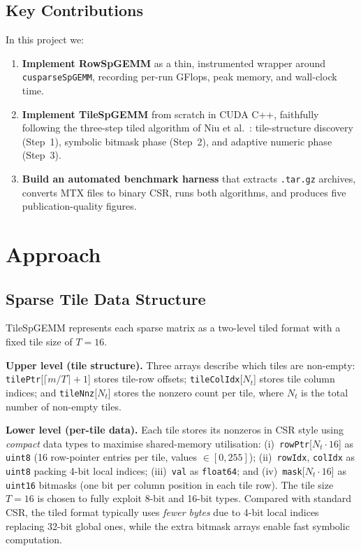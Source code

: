 \documentclass[conference]{IEEEtran}
\begin{document}
\subsection*{Key Contributions}

In this project we:
\begin{enumerate}
\item \textbf{Implement RowSpGEMM} as a thin, instrumented wrapper around
  \texttt{cusparseSpGEMM}, recording per-run GFlops, peak memory, and
  wall-clock time.
\item \textbf{Implement TileSpGEMM} from scratch in CUDA C++, faithfully
  following the three-step tiled algorithm of Niu et al.~\cite{tilespgemm}:
  tile-structure discovery (Step~1), symbolic bitmask phase (Step~2), and
  adaptive numeric phase (Step~3).
\item \textbf{Build an automated benchmark harness} that extracts
  \texttt{.tar.gz} archives, converts MTX files to binary CSR, runs both
  algorithms, and produces five publication-quality figures.
\end{enumerate}

\section{Approach}

\subsection{Sparse Tile Data Structure}

TileSpGEMM represents each sparse matrix as a two-level tiled format
with a fixed tile size of $T = 16$.

\textbf{Upper level (tile structure).}
Three arrays describe which tiles are non-empty:
\texttt{tilePtr}[$\lceil m/T \rceil + 1$] stores tile-row offsets;
\texttt{tileColIdx}[$N_t$] stores tile column indices; and
\texttt{tileNnz}[$N_t$] stores the nonzero count per tile, where $N_t$
is the total number of non-empty tiles.

\textbf{Lower level (per-tile data).}
Each tile stores its nonzeros in CSR style using \emph{compact}
data types to maximise shared-memory utilisation:
(i)~\texttt{rowPtr}[$N_t \cdot 16$] as \texttt{uint8} (16 row-pointer
entries per tile, values $\in[0,255]$);
(ii)~\texttt{rowIdx}, \texttt{colIdx} as \texttt{uint8} packing 4-bit
local indices;
(iii)~\texttt{val} as \texttt{float64}; and
(iv)~\texttt{mask}[$N_t \cdot 16$] as \texttt{uint16} bitmasks (one bit
per column position in each tile row).
The tile size $T=16$ is chosen to fully exploit 8-bit and 16-bit types.
Compared with standard CSR, the tiled format typically uses
\emph{fewer bytes} due to 4-bit local indices replacing 32-bit global
ones, while the extra bitmask arrays enable fast symbolic computation.
\end{document}
